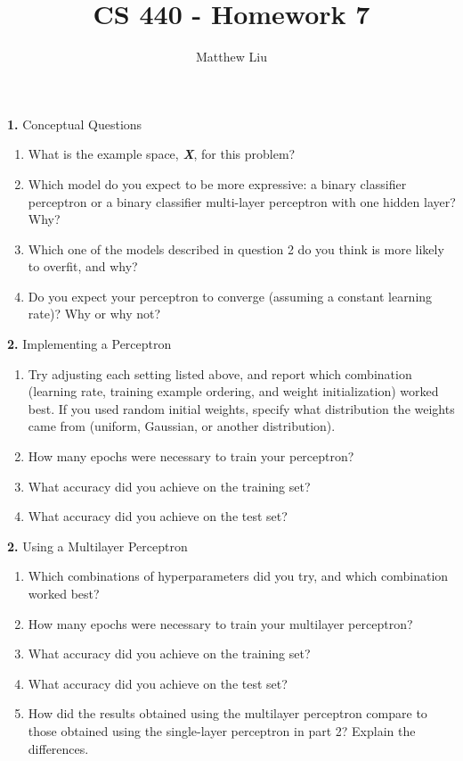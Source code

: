 \documentclass[titlepage]{article}
\title{CS 440 - Homework 7}
\author{Matthew Liu}
\date{}
\begin{document}
\maketitle{}

\noindent \textbf{1. } Conceptual Questions \\

\begin{enumerate}
	\item What is the example space, \textbf{\textit{X}}, for this problem?
	\item Which model do you expect to be more expressive: a binary classifier perceptron or a binary classifier multi-layer perceptron with one hidden layer? Why?
	\item Which one of the models described in question 2 do you think is more likely to overfit, and why?
	\item Do you expect your perceptron to converge (assuming a constant learning rate)? Why or why not?
\end{enumerate}

\noindent \textbf{2. } Implementing a Perceptron \\

\begin{enumerate}
	\item Try adjusting each setting listed above, and report which combination (learning rate, training example ordering, and weight initialization) worked best. If you used random initial weights, specify what distribution the weights came from (uniform, Gaussian, or another distribution).
	\item How many epochs were necessary to train your perceptron?
	\item What accuracy did you achieve on the training set?
	\item What accuracy did you achieve on the test set?	
\end{enumerate}

\noindent \textbf{2. } Using a Multilayer Perceptron \\

\begin{enumerate}
	\item Which combinations of hyperparameters did you try, and which combination worked best?
	\item How many epochs were necessary to train your multilayer perceptron?
	\item What accuracy did you achieve on the training set?
	\item What accuracy did you achieve on the test set?	
	\item How did the results obtained using the multilayer perceptron compare to those obtained using the single-layer perceptron in part 2? Explain the differences.
\end{enumerate}
\end{document}
